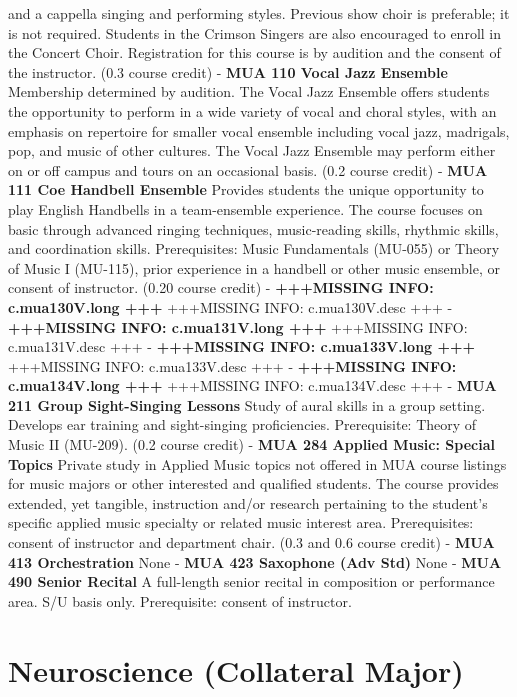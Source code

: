 \documentclass[
  letterpaper,
]{scrbook}
\begin{document}
and a cappella singing and performing styles. Previous show choir is
preferable; it is not required. Students in the Crimson Singers are also
encouraged to enroll in the Concert Choir. Registration for this course
is by audition and the consent of the instructor. (0.3 course credit) -
\textbf{MUA 110 Vocal Jazz Ensemble} Membership determined by audition.
The Vocal Jazz Ensemble offers students the opportunity to perform in a
wide variety of vocal and choral styles, with an emphasis on repertoire
for smaller vocal ensemble including vocal jazz, madrigals, pop, and
music of other cultures. The Vocal Jazz Ensemble may perform either on
or off campus and tours on an occasional basis. (0.2 course credit) -
\textbf{MUA 111 Coe Handbell Ensemble} Provides students the unique
opportunity to play English Handbells in a team-ensemble experience. The
course focuses on basic through advanced ringing techniques,
music-reading skills, rhythmic skills, and coordination skills.
Prerequisites: Music Fundamentals (MU-055) or Theory of Music I
(MU-115), prior experience in a handbell or other music ensemble, or
consent of instructor. (0.20 course credit) - \textbf{+++MISSING INFO:
c.mua130V.long +++} +++MISSING INFO: c.mua130V.desc +++ -
\textbf{+++MISSING INFO: c.mua131V.long +++} +++MISSING INFO:
c.mua131V.desc +++ - \textbf{+++MISSING INFO: c.mua133V.long +++}
+++MISSING INFO: c.mua133V.desc +++ - \textbf{+++MISSING INFO:
c.mua134V.long +++} +++MISSING INFO: c.mua134V.desc +++ - \textbf{MUA
211 Group Sight-Singing Lessons} Study of aural skills in a group
setting. Develops ear training and sight-singing proficiencies.
Prerequisite: Theory of Music II (MU-209). (0.2 course credit) -
\textbf{MUA 284 Applied Music: Special Topics} Private study in Applied
Music topics not offered in MUA course listings for music majors or
other interested and qualified students. The course provides extended,
yet tangible, instruction and/or research pertaining to the student's
specific applied music specialty or related music interest area.
Prerequisites: consent of instructor and department chair. (0.3 and 0.6
course credit) - \textbf{MUA 413 Orchestration} None - \textbf{MUA 423
Saxophone (Adv Std)} None - \textbf{MUA 490 Senior Recital} A
full-length senior recital in composition or performance area. S/U basis
only. Prerequisite: consent of instructor.

\section{Neuroscience (Collateral Major)}\label{sec-neuroscience}
\end{document}
